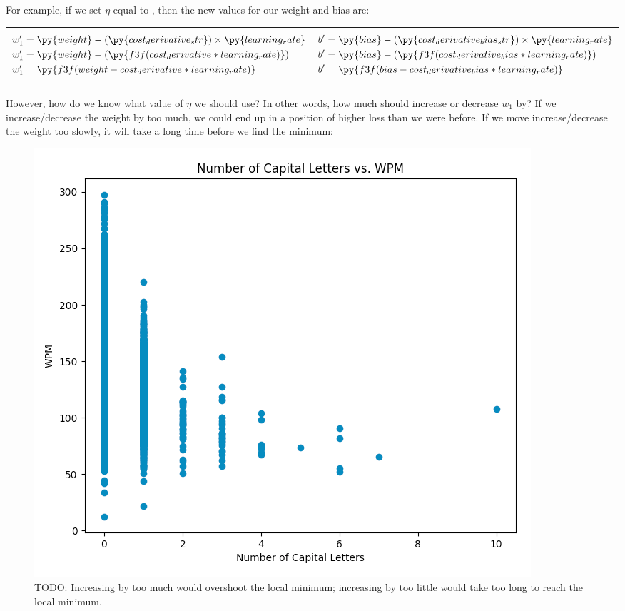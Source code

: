 \documentclass[12pt]{article}
\begin{document}
{
\setlength{\abovedisplayskip}{0pt}
\setlength{\belowdisplayskip}{0pt}
For example, if we set $\eta$ equal to , then the new values for our weight and bias are:
\begin{center}
	\begin{tabularx}{0.8\linewidth}{X X}
		\vbox{
			\begin{align*}
				w_1' & = \py{weight} - (\py{cost_derivative_str}) \times \py{learning_rate}
				\\
				w_1' & = \py{weight} - (\py{f3f(cost_derivative * learning_rate)})
				\\
				w_1' & = \py{f3f(weight - cost_derivative * learning_rate)}
			\end{align*}
		} &
		\vbox{
			\begin{align*}
				b' & = \py{bias} - (\py{cost_derivative_bias_str}) \times \py{learning_rate}
				\\
				b' & = \py{bias} - (\py{f3f(cost_derivative_bias * learning_rate)})
				\\
				b' & = \py{f3f(bias - cost_derivative_bias * learning_rate)}
			\end{align*}
		}
	\end{tabularx}
\end{center}
}

However, how do we know what value of $\eta$ we should use? In other words, how much should increase or decrease $w_1$ by? If we increase/decrease the weight by too much, we could end up in a position of higher loss than we were before. If we move increase/decrease the weight too slowly, it will take a long time before we find the minimum:

\begin{figure}[H]
	\centering
	\caption{TODO: Increasing by too much would overshoot the local minimum; increasing by too little would take too long to reach the local minimum.}
	\includegraphics[width=\linewidth]{todo.png}
\end{figure}
\end{document}
